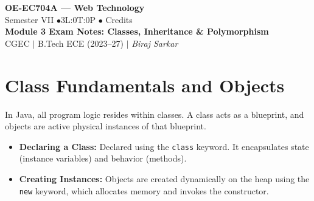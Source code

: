 \documentclass[12pt,a4paper]{article}
\begin{document}

\begin{center}
  {\LARGE\bfseries\color{myred} OE-EC704A --- Web Technology}\\[5pt]
  {\normalsize\color{mydark} Semester VII \quad$\bullet$\quad 3L:0T:0P \quad$\bullet$ Credits}\\[3pt]
  {\normalsize\color{myteal}\textbf{Module 3 Exam Notes: Classes, Inheritance \& Polymorphism}}\\[3pt]
  {\small\color{mydark} CGEC \;$|$\; B.Tech ECE (2023--27) \;$|$\; \textit{Biraj Sarkar}}
\end{center}
\noindent{\color{myred}\rule{\linewidth}{1.5pt}}
\vspace{2pt}

\hypersetup{linkcolor=mydark}
\tableofcontents
\hypersetup{linkcolor=myteal}
\newpage

\section{Class Fundamentals and Objects}

In Java, all program logic resides within classes. A class acts as a blueprint, and objects are active physical instances of that blueprint.

\begin{tcolorbox}[defbox, title={\textbf{Class Declaration \& Object Creation}}]
\begin{itemize}[leftmargin=*, itemsep=3pt]
  \item \textbf{Declaring a Class:} Declared using the \texttt{class} keyword. It encapsulates state (instance variables) and behavior (methods).
  \item \textbf{Creating Instances:} Objects are created dynamically on the heap using the \texttt{new} keyword, which allocates memory and invokes the constructor.
\end{itemize}
\end{tcolorbox}
\end{document}
